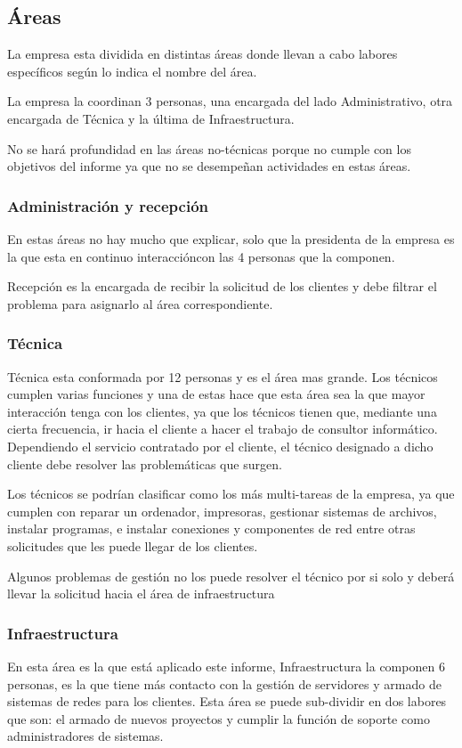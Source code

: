 \documentclass[12pt,a4paper]{article}
\begin{document}
\subsection{Áreas}
La empresa esta dividida en distintas áreas donde llevan a cabo labores específicos según lo indica el nombre del área.

La empresa la coordinan 3 personas, una encargada del lado Administrativo, otra encargada de Técnica y la última de Infraestructura.

No se hará profundidad en las áreas no-técnicas porque no cumple con los objetivos del informe ya que no se desempeñan actividades en estas áreas.

\subsubsection{Administración y recepción}
En estas áreas no hay mucho que explicar, solo que la presidenta de la empresa es la que esta en continuo interaccióncon las 4 personas que la componen.

Recepción es la encargada de recibir la solicitud de los clientes y debe filtrar el problema para asignarlo al área correspondiente. 

\subsubsection{Técnica}
Técnica esta conformada por 12 personas y es el área mas grande. Los técnicos cumplen varias funciones y una de estas hace que esta área sea la que mayor interacción tenga con los clientes, ya que los técnicos tienen que, mediante una cierta frecuencia, ir hacia el cliente a hacer el trabajo de consultor informático. Dependiendo el servicio contratado por el cliente, el técnico designado a dicho cliente debe resolver las problemáticas que surgen.

Los técnicos se podrían clasificar como los más multi-tareas de la empresa, ya que cumplen con reparar un ordenador, impresoras, gestionar sistemas de archivos, instalar programas, e instalar conexiones y componentes de red entre otras solicitudes que les puede llegar de los clientes.

Algunos problemas de gestión no los puede resolver el técnico por si solo y deberá llevar la solicitud hacia el área de infraestructura

\subsubsection{Infraestructura}
En esta área es la que está aplicado este informe, Infraestructura la componen 6 personas, es la que tiene más contacto con la gestión de servidores y armado de sistemas de redes para los clientes. Esta área se puede sub-dividir en dos labores que son: el armado de nuevos proyectos y cumplir la función de soporte como administradores de sistemas.
\end{document}
